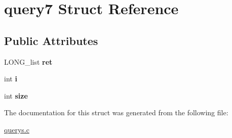 \hypertarget{structquery7}{}\section{query7 Struct Reference}
\label{structquery7}
\subsection*{Public Attributes}
\begin{DoxyCompactItemize}
\item 
L\+O\+N\+G\+\_\+list {\bfseries ret}\hypertarget{structquery7_a740c195be916e65479d1634a8412d8cd}{}\label{structquery7_a740c195be916e65479d1634a8412d8cd}

\item 
int {\bfseries i}\hypertarget{structquery7_a6288e4ac4152354e939fbaf31099618b}{}\label{structquery7_a6288e4ac4152354e939fbaf31099618b}

\item 
int {\bfseries size}\hypertarget{structquery7_aafe8e86cd9984e7b3b268be09b065829}{}\label{structquery7_aafe8e86cd9984e7b3b268be09b065829}

\end{DoxyCompactItemize}


The documentation for this struct was generated from the following file\+:\begin{DoxyCompactItemize}
\item 
\hyperlink{querys_8c}{querys.\+c}\end{DoxyCompactItemize}
